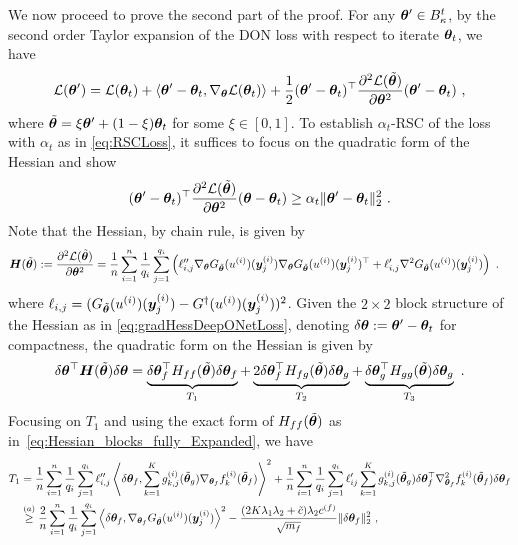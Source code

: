 We now proceed to prove the second part of the proof. 
For any ${\bm{\theta}}' \in B^t_{\kappa}$, by the second order Taylor expansion of the DON loss with respect to iterate ${\bm{\theta}}_t$, we have
\[
{\cal L}({\bm{\theta}}') = {\cal L}({\bm{\theta}}_t) + \langle {\bm{\theta}}' - {\bm{\theta}}_t, \nabla_{\bm{\theta}}{\cal L}({\bm{\theta}}_t) \rangle + \frac{1}{2} ({\bm{\theta}}'-{\bm{\theta}}_t)^\top \frac{\partial^2 {\cal L}(\tilde{{\bm{\theta}}})}{\partial {\bm{\theta}}^2} ({\bm{\theta}}'-{\bm{\theta}}_t)~,
\]
where $\tilde{{\bm{\theta}}} = \xi {\bm{\theta}}' + (1-\xi) {\bm{\theta}}_t$ for some $\xi \in [0,1]$. To establish $\alpha_t$-RSC of the loss with $\alpha_t$ as in \eqref{eq:RSCLoss}, it suffices to focus on the quadratic form of the Hessian and show 
\begin{equation}
({\bm{\theta}}' - {\bm{\theta}}_t)^{\top} \frac{\partial^2 {\cal L}(\tilde{{\bm{\theta}}})}{\partial {\bm{\theta}}^2}  ({\bm{\theta}} - {\bm{\theta}}_t) \geq \alpha_t \| {\bm{\theta}}' - {\bm{\theta}}_t \|_2^2~.
\end{equation}
Note that the Hessian, by chain rule, is given by
\begin{align*}
{\bm{H}} (\tilde{{\bm{\theta}}}) & := \frac{\partial^2 {\cal L}(\tilde{{\bm{\theta}}})}{\partial {\bm{\theta}}^2}  
=  \frac{1}{n} \sum_{i=1}^n \frac{1}{q_i} \sum_{j=1}^{q_i}  \left( \ell^{\prime\prime}_{i,j} \nabla_{{\bm{\theta}}} G_{\tilde{{\bm{\theta}}}}(u^{(i)})({\bm{y}}^{(i)}_j) \nabla_{{\bm{\theta}}} G_{\tilde{{\bm{\theta}}}}(u^{(i)})({\bm{y}}^{(i)}_j)^\top  
+ \ell^{\prime}_{i,j}   \nabla^2 G_{\tilde{{\bm{\theta}}}}(u^{(i)})({\bm{y}}^{(i)}_j) \right)~. 
\end{align*}
where 
$\ell_{i,j}=(G_{\tilde{{\bm{\theta}}}}(u^{(i)})({\bm{y}}_{j}^{(i)})-G^\dagger(u^{(i)})({\bm{y}}^{(i)}_j))^2$. 
Given the $2 \times 2$ block structure of the Hessian as in \eqref{eq:gradHessDeepONetLoss}, denoting $\delta {\bm{\theta}} := {\bm{\theta}}' - {\bm{\theta}}_t$ for compactness, the quadratic form on the Hessian is given by
\begin{equation}
\delta {\bm{\theta}}^{\top} {\bm{H}} (\tilde{{\bm{\theta}}}) \delta {\bm{\theta}} 
= \underbrace{\delta {\bm{\theta}}_{f}^{\top} H_{ff}(\tilde{{\bm{\theta}}}) \delta {\bm{\theta}}_{f}}_{T_1}
        + \underbrace{2 \delta {\bm{\theta}}_{f}^{\top} H_{fg}(\tilde{{\bm{\theta}}}) \delta {\bm{\theta}}_{g}}_{T_2}
        + \underbrace{\delta {\bm{\theta}}_{g}^{\top} H_{gg}(\tilde{{\bm{\theta}}}) \delta {\bm{\theta}}_{g}}_{T_3}~.
\end{equation}
Focusing on $T_1$ and using the exact form of $H_{ff}(\tilde{{\bm{\theta}}})$ as in~\eqref{eq:Hessian_blocks_fully_Expanded}, we have
\begin{align*}
    T_1 & = \frac{1}{n} \sum_{i=1}^n \frac{1}{q_i} \sum_{j=1}^{q_i} \ell^{\prime\prime}_{i,j} \left\langle \delta {\bm{\theta}}_f , \sum_{k=1}^K g_{k,j}^{(i)}(\tilde{{\bm{\theta}}}_g) \nabla_{{\bm{\theta}}_f} f_k^{(i)}(\tilde{{\bm{\theta}}}_f) \right\rangle^2 
    + \frac{1}{n} \sum_{i=1}^n \frac{1}{q_i} \sum_{j=1}^{q_i} \ell'_{ij} \sum_{k=1}^K g^{(i)}_{k,j}(\tilde{{\bm{\theta}}}_g) \delta {\bm{\theta}}_f^{\top} \nabla_{{\bm{\theta}}_f}^2 f_k^{(i)}(\tilde{{\bm{\theta}}}_f) \delta {\bm{\theta}}_f \nonumber \\
    & \overset{(a)}{\geq} \frac{2}{n} \sum_{i=1}^n \frac{1}{q_i} \sum_{j=1}^{q_i}  \left\langle \delta {\bm{\theta}}_f , \nabla_{{\bm{\theta}}_f} G_{\tilde{{\bm{\theta}}}}(u^{(i)})({\bm{y}}^{(i)}_j)  \right\rangle^2 - \frac{(2K\lambda_1\lambda_2+\tilde{c})\lambda_2 c^{(f)}}{\sqrt{m_f}} \| \delta {\bm{\theta}}_f \|_2^2~,
\end{align*}
